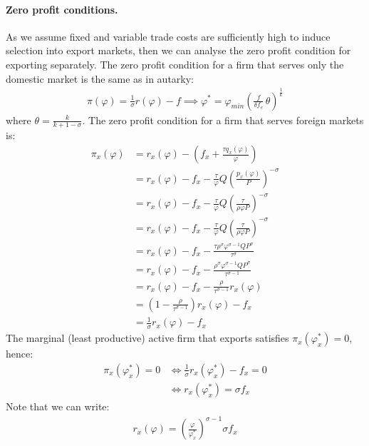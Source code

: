 \begin{solution}
	\paragraph{Zero profit conditions.} As we assume fixed and variable trade costs are sufficiently high to induce selection into export markets, then we can analyse the zero profit condition for exporting separately. The zero profit condition for a firm that serves only the domestic market is the same as in autarky:
	\begin{align*}
		\pi(\varphi) = \frac{1}{\sigma} r(\varphi) - f \implies \varphi^* = \varphi_{min} \left( \frac{f}{\delta f_e}\, \theta \right)^{\frac{1}{k}}
	\end{align*}
	where $\theta = \frac{k}{k + 1 - \sigma}$. The zero profit condition for a firm that serves foreign markets is:
	\begin{align*}
		\pi_x(\varphi) &= r_x(\varphi) - \left( f_x + \frac{\tau q_x(\varphi)}{\varphi} \right) \\
		&= r_x(\varphi) - f_x - \frac{\tau}{\varphi} Q \left( \frac{p_x(\varphi)}{P} \right)^{-\sigma} \\
		&= r_x(\varphi) - f_x - \frac{\tau}{\varphi} Q \left( \frac{\tau}{\rho\varphi P} \right)^{-\sigma} \\
		&= r_x(\varphi) - f_x - \frac{\tau}{\varphi} Q \left(\frac{\tau}{\rho\varphi P}\right)^{-\sigma} \\
		&= r_x(\varphi) - f_x - \frac{\tau \rho^{\sigma} \varphi^{\sigma - 1} Q P^{\sigma}}{\tau^{\sigma}} \\
		&= r_x(\varphi) - f_x - \frac{\rho^{\sigma} \varphi^{\sigma - 1} Q P^{\sigma}}{\tau^{\sigma - 1}} \\
		&= r_x(\varphi) - f_x - \frac{\rho}{\tau^{\sigma - 1}} r_x(\varphi) \\
		&= \left(1 - \frac{\rho}{\tau^{\sigma - 1}}\right) r_x(\varphi) - f_x \\
		&= \frac{1}{\sigma} r_x(\varphi) - f_x
	\end{align*}
	The marginal (least productive) active firm that exports satisfies $\pi_x(\varphi_x^*)=0$, hence:
	\begin{align*}
		\pi_x(\varphi_x^*) = 0 &\iff \frac{1}{\sigma} r_x(\varphi_x^*) - f_x = 0 \\
		&\iff r_x(\varphi_x^*) = \sigma f_x
	\end{align*}
	Note that we can write:
	\begin{align*}
		r_x(\varphi) = \left(\frac{\varphi}{\varphi_x^*}\right)^{\sigma - 1} \sigma f_x
	\end{align*}
\end{solution}